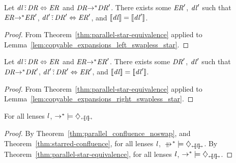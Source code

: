 \documentclass[numbers]{sigplanconf}
\begin{document}
\begin{corollary}
  \label{cor:copyable_expansions_left_serialized_star}
  Let $\mathit{dl} \,\tilde{:}\, \mathit{DR} \Leftrightarrow
  \mathit{ER}$ and $\mathit{DR} {\rightarrow}^* \mathit{DR}'$.  There
  exists some
  $\mathit{ER}'$, $\mathit{dl}'$ such that $\mathit{ER}
  {\rightarrow}^* \mathit{ER}'$,
  $\mathit{dl}' \,\tilde{:}\,
  \mathit{DR}' \Leftrightarrow \mathit{ER}'$, and $[ \! [\mathit{dl}] \! ] =
  [ \! [\mathit{dl}'] \! ]$.
\end{corollary}
\begin{proof}
  From Theorem~\ref{thm:parallel-star-equivalence} applied to
  Lemma~\ref{lem:copyable_expansions_left_swapless_star}.
\end{proof}

\begin{corollary}
  \label{cor:copyable_expansions_right_serialized_star}
  Let $\mathit{dl} \,\tilde{:}\, \mathit{DR} \Leftrightarrow
  \mathit{ER}$ and $\mathit{ER} {\rightarrow}^* \mathit{ER}'$.  There
  exists some
  $\mathit{DR}'$, $\mathit{dl}'$ such that $\mathit{DR}
  {\rightarrow}^* \mathit{DR}'$,
  $\mathit{dl}' \,\tilde{:}\,
  \mathit{DR}' \Leftrightarrow \mathit{ER}'$, and $[ \! [\mathit{dl}] \! ] =
  [ \! [\mathit{dl}'] \! ]$.
\end{corollary}
\begin{proof}
  From Theorem~\ref{thm:parallel-star-equivalence} applied to
  Lemma~\ref{lem:copyable_expansions_right_swapless_star}.
\end{proof}

\begin{corollary}
  \label{cor:rewrite-confluence}
  For all lenses $\mathit{l}$,
  $\IsConfluentWithPropertyOf{\StarOf{\Rewrite}}{\DNFLensHasSemanticsOf{\Lens}}$
\end{corollary}
\begin{proof}
  By Theorem~\ref{thm:parallel_confluence_noswap}, and
  Theorem~\ref{thm:starred-confluence},
  for all lenses $\mathit{l}$,
  $\IsConfluentWithPropertyOf
  {\StarOf{\ParallelRewrite}}{\DNFLensHasSemanticsOf{\Lens}}$.
  By Theorem~\ref{thm:parallel-star-equivalence},
  for all lenses $\mathit{l}$,
  $\IsConfluentWithPropertyOf
  {\StarOf{\Rewrite}}{\DNFLensHasSemanticsOf{\Lens}}$.
\end{proof}
\end{document}
